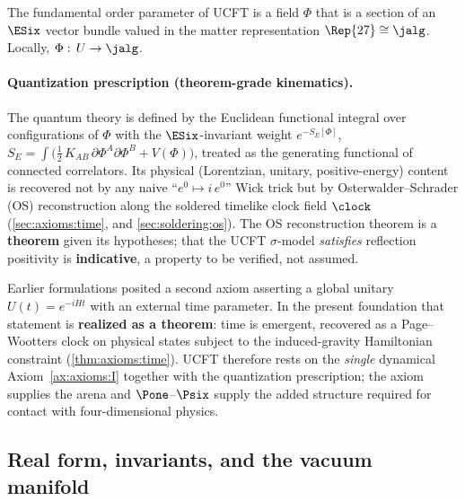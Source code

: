 \begin{axiom}\label{ax:axioms:I}
The fundamental order parameter of UCFT is a field $\Phi$ that is a section
of an $\ESix$ vector bundle valued in the matter representation
$\Rep{27}\cong\jalg$. Locally, $\Phi:\,U\to\jalg$.
\end{axiom}

\paragraph{Quantization prescription (theorem-grade kinematics).}
The quantum theory is defined by the Euclidean functional integral over
configurations of $\Phi$ with the $\ESix$-invariant weight $e^{-S_E[\Phi]}$,
$S_E=\int\!\bigl(\tfrac12\,K_{\!AB}\,\partial\Phi^A\partial\Phi^B+V(\Phi)\bigr)$,
treated as the generating functional of connected correlators. Its physical
(Lorentzian, unitary, positive-energy) content is recovered not by any naive
``$e^0\mapsto i\,e^0$'' Wick trick but by Osterwalder--Schrader (OS)
reconstruction along the soldered timelike clock field $\clock$
(\autoref{sec:axioms:time}, and \autoref{sec:soldering:os}). The OS
reconstruction theorem is a \textbf{theorem} given its hypotheses; that the
UCFT $\sigma$-model \emph{satisfies} reflection positivity is
\textbf{indicative}, a property to be verified, not assumed.

\begin{remark}\label{rem:axioms:honest}
Earlier formulations posited a second axiom asserting a global unitary
$U(t)=e^{-iHt}$ with an external time parameter. In the present foundation
that statement is \textbf{realized as a theorem}: time is emergent, recovered
as a Page--Wootters clock on physical states subject to the induced-gravity
Hamiltonian constraint (\autoref{thm:axioms:time}). UCFT therefore rests on the
\emph{single} dynamical Axiom~\ref{ax:axioms:I} together with the quantization
prescription; the axiom supplies the arena and $\Pone$--$\Psix$ supply the
added structure required for contact with four-dimensional physics.
\end{remark}

\subsection{Real form, invariants, and the vacuum manifold}
\label{sec:axioms:realform}

